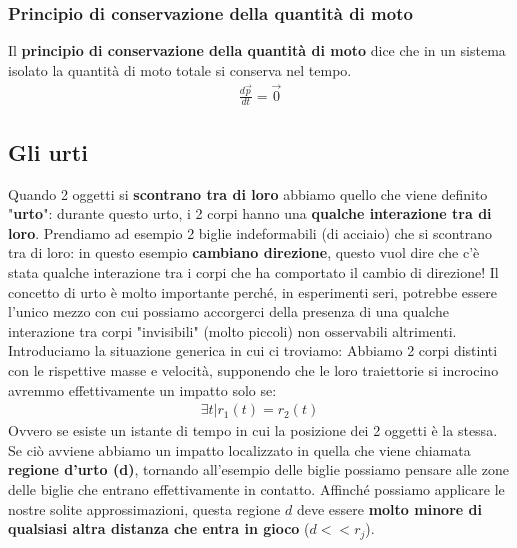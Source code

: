         \subsubsection{Principio di conservazione della quantità di moto}
            Il \textbf{principio di conservazione della quantità di moto} dice che in un sistema isolato la quantità di moto totale si conserva nel tempo.
            \begin{align*}
                \frac{d\vec{p}}{dt}=\vec{0}
            \end{align*}

    \subsection{Gli urti}
        Quando 2 oggetti si \textbf{scontrano tra di loro} abbiamo quello che viene definito "\textbf{urto}": durante questo urto, i 2 corpi hanno una \textbf{qualche interazione tra di loro}. Prendiamo ad esempio 2 biglie indeformabili (di acciaio) che si scontrano tra di loro: in questo esempio \textbf{cambiano direzione}, questo vuol dire che c'è stata qualche interazione tra i corpi che ha comportato il cambio di direzione! Il concetto di urto è molto importante perché, in esperimenti seri, potrebbe essere l'unico mezzo con cui possiamo accorgerci della presenza di una qualche interazione tra corpi "invisibili" (molto piccoli) non osservabili altrimenti.
        \medskip\\
        Introduciamo la situazione generica in cui ci troviamo:
        Abbiamo 2 corpi distinti con le rispettive masse e velocità, supponendo che le loro traiettorie si incrocino avremmo effettivamente un impatto solo se:
        \begin{align*}
            \exists t|r_1(t)=r_2(t)
        \end{align*}
        Ovvero se esiste un istante di tempo in cui la posizione dei 2 oggetti è la stessa. Se ciò avviene abbiamo un impatto localizzato in quella che viene chiamata \textbf{regione d'urto (d)}, tornando all'esempio delle biglie possiamo pensare alle zone delle biglie che entrano effettivamente in contatto. Affinché possiamo applicare le nostre solite approssimazioni, questa regione $d$ deve essere \textbf{molto minore di qualsiasi altra distanza che entra in gioco} ($d << r_j$).

